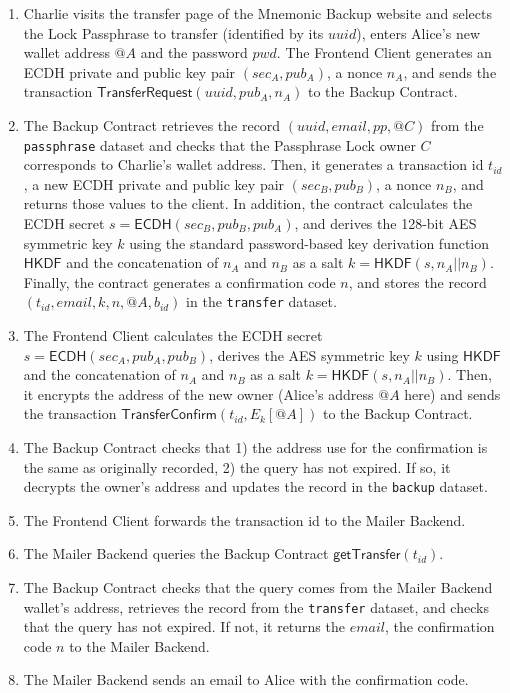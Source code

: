 \documentclass[runningheads]{llncs}
\newcommand{\ms}[1]{\ensuremath{\mathsf{#1}}}
\begin{document}
\begin{enumerate} 
\item Charlie visits the transfer page of the Mnemonic Backup website and selects the Lock Passphrase to transfer (identified by its $uuid$), enters Alice's new wallet address $@A$ and the password $pwd$. The Frontend Client generates an ECDH private and public key pair $(sec_A, pub_A)$, a nonce $n_A$, and sends the transaction $\ms{TransferRequest}(uuid, pub_A, n_A)$ to the Backup Contract. 
\item The Backup Contract retrieves the record $(uuid, email, pp, @C)$ from the {\tt passphrase} dataset and checks that the Passphrase Lock owner $C$ corresponds to Charlie's wallet address. Then, it generates a transaction id $t_{id}$, a new ECDH private and public key pair $(sec_B, pub_B)$, a nonce $n_B$, and returns those values to the client. In addition, the contract calculates the ECDH secret $s=\ms{ECDH}(sec_B, pub_B, pub_A)$, and derives the 128-bit AES symmetric key $k$ using the standard password-based key derivation function $\ms{HKDF}$ and the concatenation of $n_A$ and $n_B$ as a salt $k=\ms{HKDF}(s, n_A || n_B)$. Finally, the contract generates a confirmation code $n$, and stores the record $(t_{id}, email, k, n, @A, b_{id})$ in the {\tt transfer} dataset. 
\item The Frontend Client calculates the ECDH secret $s=\ms{ECDH}(sec_A, pub_A, pub_B)$, derives the AES symmetric key $k$ using $\ms{HKDF}$ and the concatenation of $n_A$ and $n_B$ as a salt $k=\ms{HKDF}(s, n_A || n_B)$. Then, it encrypts the address of the new owner (Alice's address $@A$ here) and sends the transaction $\ms{TransferConfirm}(t_{id}, E_{k}[@A])$ to the Backup Contract. 
\item The Backup Contract checks that 1) the address use for the confirmation is the same as originally recorded, 2) the query has not expired. If so, it decrypts the owner's address and updates the record in the {\tt backup} dataset.
\item The Frontend Client forwards the transaction id to the Mailer Backend. 
\item The Mailer Backend queries the Backup Contract $\ms{getTransfer}(t_{id})$. 
\item The Backup Contract checks that the query comes from the Mailer Backend wallet's address, retrieves the record from the {\tt transfer} dataset, and checks that the query has not expired. If not, it returns the $email$, the confirmation code $n$ to the Mailer Backend. 
\item The Mailer Backend sends an email to Alice with the confirmation code. 

\end{enumerate}
\end{document}
